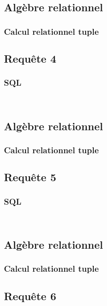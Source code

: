 \documentclass[a4paper,10pt]{article}
\begin{document}
\subsection{Algèbre relationnel}

\subsubsection{Calcul relationnel tuple}

\subsection{Requête 4}
\subsubsection{SQL}
\begin{verbatim}


\end{verbatim}
\subsection{Algèbre relationnel}

\subsubsection{Calcul relationnel tuple}

\subsection{Requête 5}
\subsubsection{SQL}
\begin{verbatim}


\end{verbatim}
\subsection{Algèbre relationnel}

\subsubsection{Calcul relationnel tuple}

\subsection{Requête 6}
\end{document}
